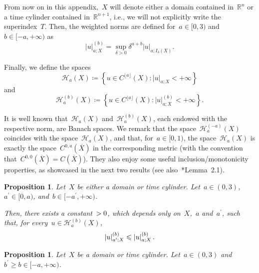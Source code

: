 \documentclass[12pt,a4paper]{amsart}
\makeatletter
\numberwithin{equation}{section}
\newtheorem{proposition}[theorem]{Proposition}
\theoremstyle{definition}
\theoremstyle{remark}
\newcommand{\R}{\mathbb{R}}
\newcommand{\abs}[1]{\left\lvert#1\right\rvert}
\renewcommand{\leq}{\leqslant}
\renewcommand{\geq}{\geqslant}
\newcommand{\constapp}[1]{%
  \csname constapp@#1\endcsname%
}
\makeatother
\begin{document}
\begin{appendix}
From now on in this appendix,~$X$ will denote either a domain contained in~$\R^n$ or a time cylinder contained in~$\R^{n+1}$, i.e., we will not explicitly write the superindex~$T$. Then, the weighted norms are defined for~$a \in [0,3)$ and~$b \in [-a,+\infty)$ as %
\begin{equation}
    \abs{u}_{a; X}^{(b)} = \sup_{\delta > 0} \delta^{a+b} \abs{u}_{a; I_\delta(X)}.
\end{equation}

Finally, we define the spaces
\begin{equation}
    \mathcal{H}_a(X) \coloneq \left\{u \in C^{\lfloor a\rfloor}(X) \colon \abs{u}_{a;X} < +\infty\right\}
\end{equation}
and
\begin{equation}
    \mathcal{H}_a^{(b)}(X) \coloneq \left\{u \in C^{\lfloor a\rfloor}(X) \colon \abs{u}_{a;X}^{(b)} < +\infty\right\}.
\end{equation}

It is well known that~$\mathcal{H}_a(X)$ and~$\mathcal{H}_a^{(b)}(X)$, each endowed with the respective norm, are Banach spaces. We remark that the space~$\mathcal{H}_a^{(-a)}(X)$ coincides with the space~$\mathcal{H}_a(X)$, and that, for~$a \in [0,1)$, the space~$\mathcal{H}_a(X)$ is exactly the space~$C^{0,a}(\overline{X})$ in the corresponding metric (with the convention that~$C^{0,0}(\overline{X}) = C(\overline{X})$). They also enjoy some useful inclusion/monotonicity properties, as showcased in the next two results (see also~\cite{MR588031}*{Lemma~2.1}). %

\begin{proposition}\label{PROP::HolderEmbeddingA}
    Let~$X$ be either a domain or time cylinder. Let~$a \in (0,3)$,~$a^\prime \in [0,a)$, and~$b \in [-a^{\prime},+\infty)$. %
    
    Then, there exists a constant~$\constapp{CONST::HolderEmbeddingA}>0$, which depends only on~$X$,~$a$ and~$a^\prime$, such that, for every~$u \in \mathcal{H}_a^{(b)}(X)$,
    \begin{equation}\label{EQ::HolderEmbeddingA}
        \abs{u}_{a^\prime; X}^{(b)} \leq \constapp{CONST::HolderEmbeddingA} \abs{u}_{a; X}^{(b)}.
    \end{equation}
\end{proposition}

\begin{proposition}\label{PROP::HolderEmbeddingB}
    Let~$X$ be a domain or time cylinder. Let~$a \in (0,3)$ and~$b^\prime \geq b\in [-a,+\infty)$. %
    

\end{proposition}
\end{appendix}
\end{document}
